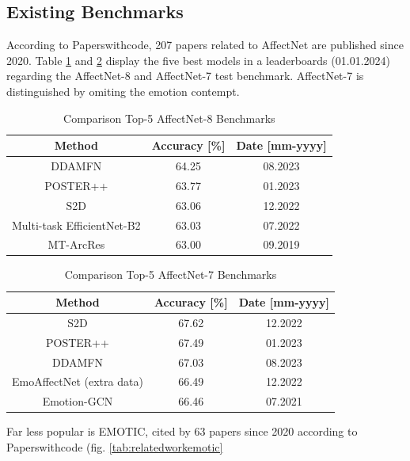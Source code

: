 \documentclass[conference]{IEEEtran}
\begin{document}
\subsection*{Existing Benchmarks}

According to Paperswithcode, 207 papers related to AffectNet are published since 2020. Table \ref{tab:relatedworkaffectnet8} and \ref{tab:relatedworkaffectnet7} display the five best models in a leaderboards (01.01.2024) regarding the AffectNet-8 and AffectNet-7 test benchmark. AffectNet-7 is distinguished by omiting the emotion contempt.

\begin{table}[htbp]
\centering
\begin{tabular}{c | c  | c }
\textbf{Method} & \textbf{Accuracy [\%]} & \textbf{Date [mm-yyyy]} \\
\hline
DDAMFN \cite{electronics12173595} & 64.25 & 08.2023  \\
POSTER++ \cite{mao2023poster} &63.77 & 01.2023   \\
S2D \cite{chen2023static}&63.06 & 12.2022   \\
Multi-task EfficientNet-B2 \cite{9815154} & 63.03 & 07.2022   \\
MT-ArcRes \cite{kollias2019expression} & 63.00 & 09.2019   \\
\end{tabular}
\caption{Comparison Top-5 AffectNet-8 Benchmarks}
\label{tab:relatedworkaffectnet8}
\end{table}

\begin{table}[htbp]
\centering
\begin{tabular}{c | c  | c }
\textbf{Method} & \textbf{Accuracy [\%]} & \textbf{Date [mm-yyyy]} \\
\hline
S2D \cite{chen2023static}&67.62 & 12.2022   \\
POSTER++ \cite{mao2023poster} &67.49 & 01.2023   \\
DDAMFN \cite{electronics12173595} & 67.03 & 08.2023  \\
EmoAffectNet \cite{RYUMINA2022435} (extra data) & 66.49 & 12.2022  \\
Emotion-GCN \cite{Antoniadis_2021} & 66.46 & 07.2021 \\
\end{tabular}
\caption{Comparison Top-5 AffectNet-7 Benchmarks}
\label{tab:relatedworkaffectnet7}
\end{table}

Far less popular is EMOTIC, cited by 63 papers since 2020 according to Paperswithcode (fig. \ref{tab:relatedworkemotic}
\end{document}
